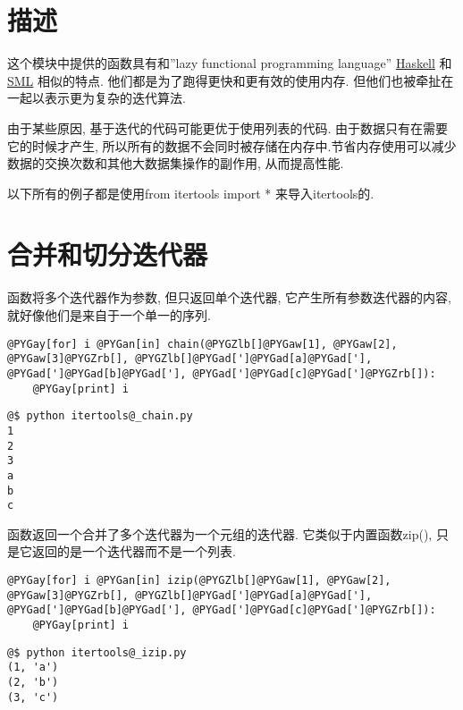 \documentclass[a4paper,10pt,english]{manual}
\begin{document}
\section{描述}

这个模块中提供的函数具有和''lazy functional programming language'' \href{http://www.haskell.org/}{Haskell} 和 \href{http://en.wikipedia.org/wiki/Standard\_ML}{SML} 相似的特点. 他们都是为了跑得更快和更有效的使用内存. 但他们也被牵扯在一起以表示更为复杂的迭代算法.

由于某些原因, 基于迭代的代码可能更优于使用列表的代码. 由于数据只有在需要它的时候才产生, 所以所有的数据不会同时被存储在内存中.节省内存使用可以减少数据的交换次数和其他大数据集操作的副作用, 从而提高性能.

以下所有的例子都是使用from itertools import * 来导入itertools的.


\section{合并和切分迭代器}

 函数将多个迭代器作为参数, 但只返回单个迭代器, 它产生所有参数迭代器的内容, 就好像他们是来自于一个单一的序列.

\begin{Verbatim}[commandchars=@\[\]]
@PYGay[for] i @PYGan[in] chain(@PYGZlb[]@PYGaw[1], @PYGaw[2], @PYGaw[3]@PYGZrb[], @PYGZlb[]@PYGad[']@PYGad[a]@PYGad['], @PYGad[']@PYGad[b]@PYGad['], @PYGad[']@PYGad[c]@PYGad[']@PYGZrb[]):
    @PYGay[print] i
\end{Verbatim}

\begin{Verbatim}[commandchars=@\[\]]
@$ python itertools@_chain.py
1
2
3
a
b
c
\end{Verbatim}

 函数返回一个合并了多个迭代器为一个元组的迭代器. 它类似于内置函数zip(), 只是它返回的是一个迭代器而不是一个列表.

\begin{Verbatim}[commandchars=@\[\]]
@PYGay[for] i @PYGan[in] izip(@PYGZlb[]@PYGaw[1], @PYGaw[2], @PYGaw[3]@PYGZrb[], @PYGZlb[]@PYGad[']@PYGad[a]@PYGad['], @PYGad[']@PYGad[b]@PYGad['], @PYGad[']@PYGad[c]@PYGad[']@PYGZrb[]):
    @PYGay[print] i
\end{Verbatim}

\begin{Verbatim}[commandchars=@\[\]]
@$ python itertools@_izip.py
(1, 'a')
(2, 'b')
(3, 'c')
\end{Verbatim}
\end{document}
